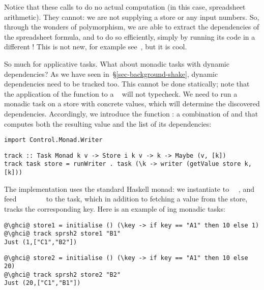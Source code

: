 \noindent
Notice that these calls to  do no actual computation (in this
case, spreadsheet arithmetic). They cannot: we are not supplying a store or any
input numbers. So, through the wonders of polymorphism, we are able to extract
the dependencies of the spreadsheet formula, and to do so efficiently, simply by
running its code in a different ! This is not new, for example
see~\cite{free-applicatives}, but it is cool.

So much for applicative tasks. What about monadic tasks with dynamic
dependencies? As we have seen in~\S\ref{sec-background-shake}, dynamic
dependencies need to be tracked too. This cannot be done statically; note that
the application of the function  to a ~ will
not typecheck. We need to run a monadic task on a store with concrete values,
which will determine the discovered dependencies. Accordingly, we introduce
the function : a combination of  and 
that computes both the resulting value and the list of its dependencies:

\vspace{1mm}
\begin{verbatim}
import Control.Monad.Writer
\end{verbatim}
\vspace{0.5mm}
\begin{verbatim}
track :: Task Monad k v -> Store i k v -> k -> Maybe (v, [k])
track task store = runWriter . task (\k -> writer (getValue store k, [k]))
\end{verbatim}
\vspace{1mm}

\noindent
The implementation uses the standard Haskell  monad: we instantiate
 to ~\hs{[@@k]}~, and feed
~~\hs{=}~~~~~\hs{[@@k])}
to the task, which in addition to fetching a value from the store, tracks the
corresponding key. Here is an example of ing monadic tasks:

\vspace{1mm}
\begin{verbatim}
@\ghci@ store1 = initialise () (\key -> if key == "A1" then 10 else 1)
@\ghci@ track sprsh2 store1 "B1"
Just (1,["C1","B2"])
\end{verbatim}
\vspace{1mm}
\begin{verbatim}
@\ghci@ store2 = initialise () (\key -> if key == "A1" then 10 else 20)
@\ghci@ track sprsh2 store2 "B2"
Just (20,["C1","B1"])
\end{verbatim}
\vspace{1mm}

